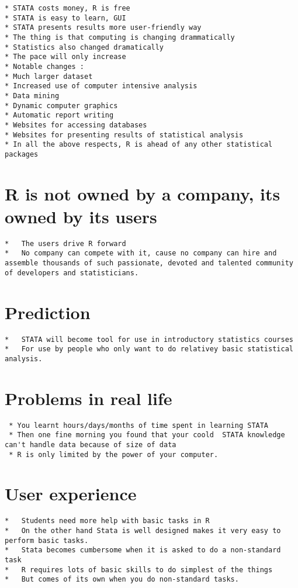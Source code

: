 \begin{verbatim}
* STATA costs money, R is free
* STATA is easy to learn, GUI
* STATA presents results more user-friendly way
* The thing is that computing is changing drammatically
* Statistics also changed dramatically
* The pace will only increase
* Notable changes :
* Much larger dataset
* Increased use of computer intensive analysis
* Data mining
* Dynamic computer graphics
* Automatic report writing
* Websites for accessing databases
* Websites for presenting results of statistical analysis
* In all the above respects, R is ahead of any other statistical packages
\end{verbatim}

\section{R is not owned by a company, its owned by its
users}\label{r-is-not-owned-by-a-company-its-owned-by-its-users}

\begin{verbatim}
*   The users drive R forward
*   No company can compete with it, cause no company can hire and assemble thousands of such passionate, devoted and talented community of developers and statisticians. 
\end{verbatim}

\section{Prediction}\label{prediction}

\begin{verbatim}
*   STATA will become tool for use in introductory statistics courses
*   For use by people who only want to do relativey basic statistical analysis. 
\end{verbatim}

\section{Problems in real life}\label{problems-in-real-life}

\begin{verbatim}
 * You learnt hours/days/months of time spent in learning STATA
 * Then one fine morning you found that your coold  STATA knowledge can't handle data because of size of data
 * R is only limited by the power of your computer. 
\end{verbatim}

\section{User experience}\label{user-experience}

\begin{verbatim}
*   Students need more help with basic tasks in R
*   On the other hand Stata is well designed makes it very easy to perform basic tasks. 
*   Stata becomes cumbersome when it is asked to do a non-standard task
*   R requires lots of basic skills to do simplest of the things
*   But comes of its own when you do non-standard tasks. 
\end{verbatim}
